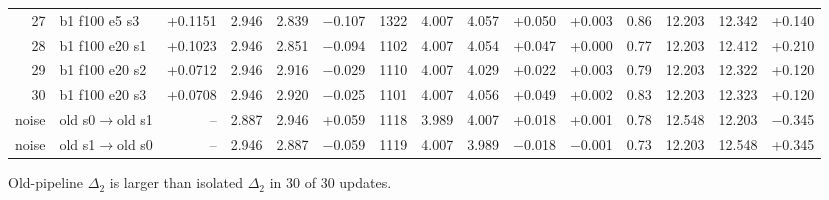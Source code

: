 \documentclass[10pt,a4paper]{article}
\begin{document}
\begin{landscape}
\begin{table}[h!]
\begin{tabular}{rlrrrrrrrrrrrrr}
27 & b1 f100 e5 s3 & +0.1151 & 2.946 & 2.839 & $-$0.107 & 1322 & 4.007 & 4.057 & +0.050 & +0.003 & 0.86 & 12.203 & 12.342 & +0.140\\
28 & b1 f100 e20 s1 & +0.1023 & 2.946 & 2.851 & $-$0.094 & 1102 & 4.007 & 4.054 & +0.047 & +0.000 & 0.77 & 12.203 & 12.412 & +0.210\\
29 & b1 f100 e20 s2 & +0.0712 & 2.946 & 2.916 & $-$0.029 & 1110 & 4.007 & 4.029 & +0.022 & +0.003 & 0.79 & 12.203 & 12.322 & +0.120\\
30 & b1 f100 e20 s3 & +0.0708 & 2.946 & 2.920 & $-$0.025 & 1101 & 4.007 & 4.056 & +0.049 & +0.002 & 0.83 & 12.203 & 12.323 & +0.120\\
\midrule
noise & old s0$\rightarrow$old s1 & -- & 2.887 & 2.946 & +0.059 & 1118 & 3.989 & 4.007 & +0.018 & +0.001 & 0.78 & 12.548 & 12.203 & $-$0.345\\
noise & old s1$\rightarrow$old s0 & -- & 2.946 & 2.887 & $-$0.059 & 1119 & 4.007 & 3.989 & $-$0.018 & $-$0.001 & 0.73 & 12.203 & 12.548 & +0.345\\
\bottomrule\end{tabular}\end{table}\end{landscape}
\FloatBarrier
Old-pipeline $\Delta_2$ is larger than isolated $\Delta_2$ in 30 of 30 updates.
\end{document}
